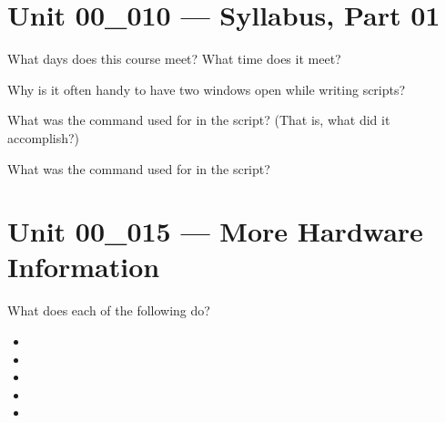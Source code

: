 \documentclass[letterpaper,12pt]{exam}
\newcommand{\unit}{Unit 00}
\begin{document}
\begin {questions}

\section*{\unit\_010 --- Syllabus, Part 01} %

\begin{samepage}
	\question What days does this course meet?  What time does it meet?
	\vspace{5mm}
\end{samepage}



\begin{samepage}
\question Why is it often handy to have two windows open while writing scripts? 
\vspace{5mm}
\end{samepage}

\begin{samepage}
\question What was the  command used for in the script? (That is, what did it accomplish?)
\vspace{5mm}
\end{samepage}


\begin{samepage}
\question  What was the  command used for in the script?
\vspace{5mm}
\end{samepage}

\section*{\unit\_015 --- More Hardware Information}

\begin{samepage}
\question What does each of the following do? 
\begin{itemize}
\item {}
\vspace{5mm}
\item {}
\vspace{5mm}
\item {}
\vspace{5mm}
\item {}
\vspace{5mm}
\item {}
\vspace{5mm}
\end{itemize}
\end{samepage}


\end{questions}
\end{document}
